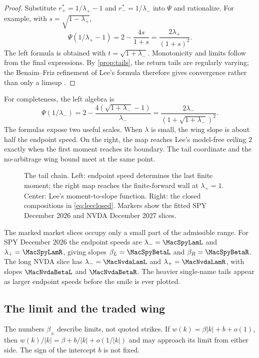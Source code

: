 \begin{proof}
Substitute $r_+^*=1/\lambda_+-1$ and $r_-^*=1/\lambda_-$ into $\Psi$ and
rationalize.  For example, with $s=\sqrt{1-\lambda_+}$,
\[
\Psi(1/\lambda_+-1)=2-\frac{4s}{1+s}
=\frac{2\lambda_+}{(1+s)^2}.
\]
The left formula is obtained with $t=\sqrt{1+\lambda_-}$.  Monotonicity and
limits follow from the final expressions.  By \cref{prop:tails}, the return
tails are regularly varying; the Benaim--Friz refinement of Lee's formula
therefore gives convergence rather than only a limsup
\citep{BenaimFriz2009}.
\end{proof}

For completeness, the left algebra is
\[
\Psi(1/\lambda_-)
=2-\frac{4(\sqrt{1+\lambda_-}-1)}{\lambda_-}
=\frac{2\lambda_-}{(1+\sqrt{1+\lambda_-})^2}.
\]
The formulas expose two useful scales.  When $\lambda$ is small, the wing
slope is about half the endpoint speed.  On the right, the map reaches Lee's
model-free ceiling $2$ exactly when the first moment reaches its boundary.
The tail coordinate and the no-arbitrage wing bound meet at the same point.

\begin{figure}[htbp]
\centering
{}
\caption{The tail chain.  Left: endpoint speed determines the last finite
moment; the right map reaches the finite-forward wall at $\lambda_+=1$.
Center: Lee's moment-to-slope function.  Right: the closed compositions in
\eqref{eq:leeclosed}.  Markers show the fitted SPY December 2026 and NVDA
December 2027 slices.}
\label{fig:tails}
\end{figure}

The marked market slices occupy only a small part of the admissible range.
For SPY December 2026 the endpoint speeds are
$\lambda_-=\MacSpyLamL$ and $\lambda_+=\MacSpyLamR$, giving slopes
$\beta_L=\MacSpyBetaL$ and $\beta_R=\MacSpyBetaR$.  The long NVDA slice has
$\lambda_-=\MacNvdaLamL$ and $\lambda_+=\MacNvdaLamR$, with slopes
$\MacNvdaBetaL$ and $\MacNvdaBetaR$.  The heavier single-name tails appear
as larger endpoint speeds before the smile is ever plotted.

\subsection{The limit and the traded wing}

The numbers $\beta_\pm$ describe limits, not quoted strikes.  If
$w(k)=\beta|k|+b+o(1)$, then $w(k)/|k|=\beta+b/|k|+o(1/|k|)$ and may approach
its limit from either side.  The sign of the intercept $b$ is not fixed.

